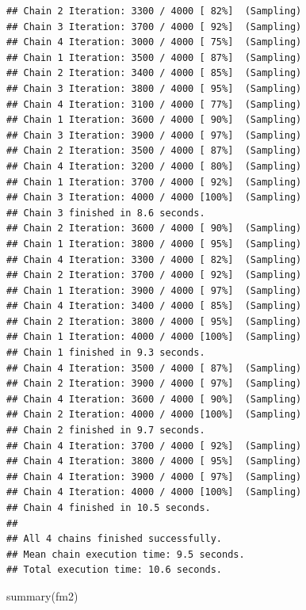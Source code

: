 \documentclass[
]{article}
\newenvironment{Shaded}{\begin{snugshade}}{\end{snugshade}}
\newcommand{\FunctionTok}[1]{\textcolor[rgb]{0.00,0.00,0.00}{#1}}
\newcommand{\NormalTok}[1]{#1}
\begin{document}
\begin{verbatim}
## Chain 2 Iteration: 3300 / 4000 [ 82%]  (Sampling) 
## Chain 3 Iteration: 3700 / 4000 [ 92%]  (Sampling) 
## Chain 4 Iteration: 3000 / 4000 [ 75%]  (Sampling) 
## Chain 1 Iteration: 3500 / 4000 [ 87%]  (Sampling) 
## Chain 2 Iteration: 3400 / 4000 [ 85%]  (Sampling) 
## Chain 3 Iteration: 3800 / 4000 [ 95%]  (Sampling) 
## Chain 4 Iteration: 3100 / 4000 [ 77%]  (Sampling) 
## Chain 1 Iteration: 3600 / 4000 [ 90%]  (Sampling) 
## Chain 3 Iteration: 3900 / 4000 [ 97%]  (Sampling) 
## Chain 2 Iteration: 3500 / 4000 [ 87%]  (Sampling) 
## Chain 4 Iteration: 3200 / 4000 [ 80%]  (Sampling) 
## Chain 1 Iteration: 3700 / 4000 [ 92%]  (Sampling) 
## Chain 3 Iteration: 4000 / 4000 [100%]  (Sampling) 
## Chain 3 finished in 8.6 seconds.
## Chain 2 Iteration: 3600 / 4000 [ 90%]  (Sampling) 
## Chain 1 Iteration: 3800 / 4000 [ 95%]  (Sampling) 
## Chain 4 Iteration: 3300 / 4000 [ 82%]  (Sampling) 
## Chain 2 Iteration: 3700 / 4000 [ 92%]  (Sampling) 
## Chain 1 Iteration: 3900 / 4000 [ 97%]  (Sampling) 
## Chain 4 Iteration: 3400 / 4000 [ 85%]  (Sampling) 
## Chain 2 Iteration: 3800 / 4000 [ 95%]  (Sampling) 
## Chain 1 Iteration: 4000 / 4000 [100%]  (Sampling) 
## Chain 1 finished in 9.3 seconds.
## Chain 4 Iteration: 3500 / 4000 [ 87%]  (Sampling) 
## Chain 2 Iteration: 3900 / 4000 [ 97%]  (Sampling) 
## Chain 4 Iteration: 3600 / 4000 [ 90%]  (Sampling) 
## Chain 2 Iteration: 4000 / 4000 [100%]  (Sampling) 
## Chain 2 finished in 9.7 seconds.
## Chain 4 Iteration: 3700 / 4000 [ 92%]  (Sampling) 
## Chain 4 Iteration: 3800 / 4000 [ 95%]  (Sampling) 
## Chain 4 Iteration: 3900 / 4000 [ 97%]  (Sampling) 
## Chain 4 Iteration: 4000 / 4000 [100%]  (Sampling) 
## Chain 4 finished in 10.5 seconds.
## 
## All 4 chains finished successfully.
## Mean chain execution time: 9.5 seconds.
## Total execution time: 10.6 seconds.
\end{verbatim}

\begin{Shaded}
\begin{Highlighting}[]
\FunctionTok{summary}\NormalTok{(fm2)}
\end{Highlighting}
\end{Shaded}
\end{document}
